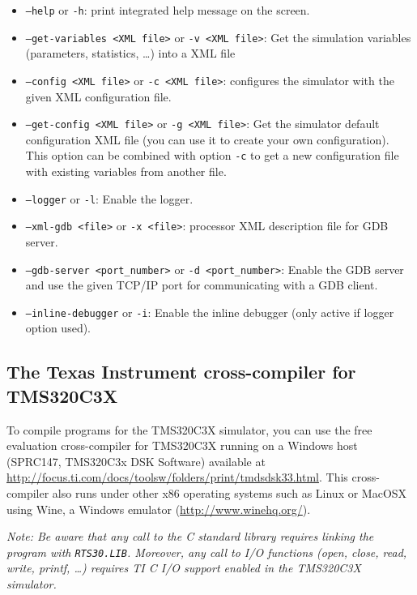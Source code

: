 \begin{itemize}
\item \texttt{--help} or \texttt{-h}: print integrated help message on the screen.
\item \texttt{--get-variables <XML file>} or \texttt{-v <XML file>}: Get the simulation variables (parameters, statistics, \ldots) into a XML file
\item \texttt{--config <XML file>} or \texttt{-c <XML file>}: configures the simulator with the given XML configuration file.
\item \texttt{--get-config <XML file>} or \texttt{-g <XML file>}: Get the simulator default configuration XML file (you can use it to create your own configuration). This option can be combined with option \texttt{-c} to get a new configuration file with existing variables from another file.
\item \texttt{--logger} or \texttt{-l}: Enable the logger.
\item \texttt{--xml-gdb <file>} or \texttt{-x <file>}: processor XML description file for GDB server.
\item \texttt{--gdb-server <port\_number>} or \texttt{-d <port\_number>}: Enable the GDB server and use the given TCP/IP port for communicating with a GDB client.
\item \texttt{--inline-debugger} or \texttt{-i}: Enable the inline debugger (only active if logger option used).
\end{itemize}

\subsection{The Texas Instrument cross-compiler for TMS320C3X}
\label{tms320c3x_cross_compiler}

To compile programs for the TMS320C3X simulator, you can use the free evaluation cross-compiler for TMS320C3X running on a Windows host (SPRC147, TMS320C3x DSK Software) available at \url{http://focus.ti.com/docs/toolsw/folders/print/tmdsdsk33.html}.
This cross-compiler also runs under other x86 operating systems such as Linux or MacOSX using Wine, a Windows emulator (\url{http://www.winehq.org/}).

\textit{Note: Be aware that any call to the C standard library requires linking the program with \texttt{RTS30.LIB}.
Moreover, any call to I/O functions (open, close, read, write, printf, \ldots) requires TI C I/O support enabled in the TMS320C3X simulator.}

